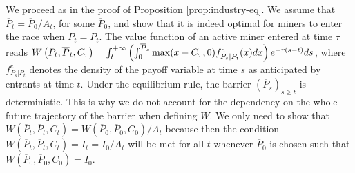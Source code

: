 \documentclass[12pt, a4paper]{article}
\begin{document}
We proceed as in the proof of Proposition \ref{prop:industry-eq}. We assume
that $\overline{P}_t=\overline{P}_0/A_t$, for some $\overline{P}_0$, and
show that it is indeed optimal for miners to enter the race when $P_t=%
\overline{P}_t$. The value function of an active miner entered at time $\tau$
reads $W\left(P_t,\overline{P}_t,C_\tau\right)=\int_t^{+\infty}\left(\int_0^{%
\overline{P}_s}\max(x-C_\tau,0)f_{P_s|P_t}^e(x)dx\right)e^{-r(s-t)}ds$,
where $f_{P_s|P_t}^e$ denotes the density of the payoff variable at time $s$
as anticipated by entrants at time $t$. Under the equilibrium rule, the
barrier $(\overline{P}_s)_{s\geq t}$ is deterministic. This is why we do not
account for the dependency on the whole future trajectory of the barrier
when defining $W$. We only need to show that $W\left(\overline{P}_t,%
\overline{P}_t,C_t\right)=W\left(\overline{P}_0,\overline{P}_0,C_0\right)/A_t
$ because then the condition $W\left(\overline{P}_t,\overline{P}%
_t,C_t\right)=I_t=I_0/A_t$ will be met for all $t$ whenever $\overline{P}_0$
is chosen such that $W\left(\overline{P}_0,\overline{P}_0,C_0\right)=I_0$.
\end{document}
